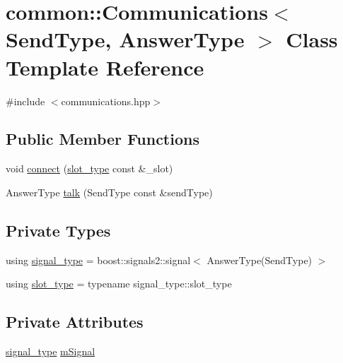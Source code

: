 \hypertarget{classcommon_1_1Communications}{}\section{common\+:\+:Communications$<$ Send\+Type, Answer\+Type $>$ Class Template Reference}
\label{classcommon_1_1Communications}


{\ttfamily \#include $<$communications.\+hpp$>$}

\subsection*{Public Member Functions}
\begin{DoxyCompactItemize}
\item 
void \mbox{\hyperlink{classcommon_1_1Communications_ac17b31727070e79b399f4a4021e17e36}{connect}} (\mbox{\hyperlink{classcommon_1_1Communications_ae7868817d46333a0221c80f9cfbaef6f}{slot\+\_\+type}} const \&\+\_\+slot)
\item 
Answer\+Type \mbox{\hyperlink{classcommon_1_1Communications_a28da50e97aa5df86b5ec62b744a60185}{talk}} (Send\+Type const \&send\+Type)
\end{DoxyCompactItemize}
\subsection*{Private Types}
\begin{DoxyCompactItemize}
\item 
using \mbox{\hyperlink{classcommon_1_1Communications_a5fcaf88c04bef4c16e4c55c2a712e492}{signal\+\_\+type}} = boost\+::signals2\+::signal$<$ Answer\+Type(Send\+Type) $>$
\item 
using \mbox{\hyperlink{classcommon_1_1Communications_ae7868817d46333a0221c80f9cfbaef6f}{slot\+\_\+type}} = typename signal\+\_\+type\+::slot\+\_\+type
\end{DoxyCompactItemize}
\subsection*{Private Attributes}
\begin{DoxyCompactItemize}
\item 
\mbox{\hyperlink{classcommon_1_1Communications_a5fcaf88c04bef4c16e4c55c2a712e492}{signal\+\_\+type}} \mbox{\hyperlink{classcommon_1_1Communications_a0d6cdea9e39fa270235d44162345ea41}{m\+Signal}}
\end{DoxyCompactItemize}


